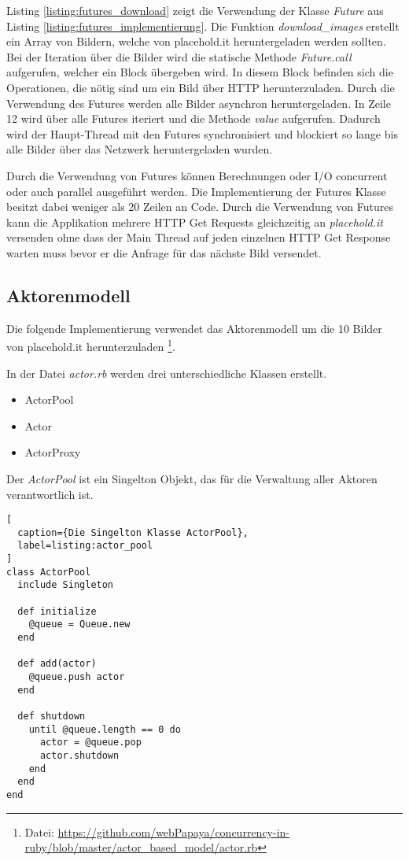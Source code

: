 Listing \ref{listing:futures_download} zeigt die Verwendung der Klasse \emph{Future} aus Listing \ref{listing:futures_implementierung}. Die Funktion \emph{download\_images} erstellt ein Array von Bildern, welche von placehold.it heruntergeladen werden sollten. Bei der Iteration über die Bilder wird die statische Methode \emph{Future.call} aufgerufen, welcher ein Block übergeben wird. In diesem Block befinden sich die Operationen, die nötig sind um ein Bild über HTTP herunterzuladen. Durch die Verwendung des Futures werden alle Bilder asynchron heruntergeladen. In Zeile 12 wird über alle Futures iteriert und die Methode \emph{value} aufgerufen. Dadurch wird der Haupt-Thread mit den Futures synchronisiert und blockiert so lange bis alle Bilder über das Netzwerk heruntergeladen wurden. 

Durch die Verwendung von Futures können Berechnungen oder I/O concurrent oder auch parallel ausgeführt werden. Die Implementierung der Futures Klasse besitzt dabei weniger als 20 Zeilen an Code. Durch die Verwendung von Futures kann die Applikation mehrere HTTP Get Requests gleichzeitig an \emph{placehold.it} versenden ohne dass der Main Thread auf jeden einzelnen HTTP Get Response warten muss bevor er die Anfrage für das nächste Bild versendet. 

\subsection{Aktorenmodell}

Die folgende Implementierung verwendet das Aktorenmodell um die 10 Bilder von placehold.it herunterzuladen \footnote{Datei: \url{https://github.com/webPapaya/concurrency-in-ruby/blob/master/actor_based_model/actor.rb}}.

In der Datei \emph{actor.rb} werden drei unterschiedliche Klassen erstellt.

\begin{itemize}
  \item ActorPool
  \item Actor
  \item ActorProxy
\end{itemize}

Der \emph{ActorPool} ist ein Singelton Objekt, das für die Verwaltung aller Aktoren verantwortlich ist. 

\begin{lstlisting}[
  caption={Die Singelton Klasse ActorPool},
  label=listing:actor_pool
]
class ActorPool
  include Singleton

  def initialize
    @queue = Queue.new
  end

  def add(actor)
    @queue.push actor
  end

  def shutdown
    until @queue.length == 0 do
      actor = @queue.pop
      actor.shutdown
    end
  end
end
\end{lstlisting}

